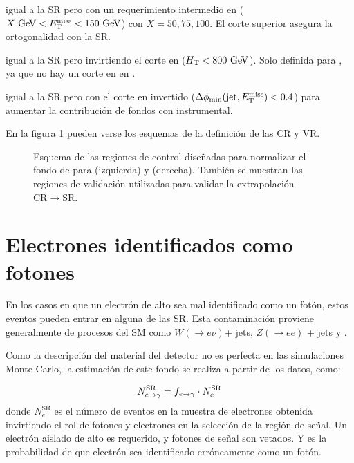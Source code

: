 \begin{description}\itemsep0.1cm
\item[{\bf VRMX}] igual a la SR pero con un requerimiento intermedio en {\met} ($X\gev < \met < 150\gev$) con $X = 50,75,100$. El corte superior asegura la ortogonalidad con la SR.
\item[{\bf VRH}]  igual a la SR pero invirtiendo el corte en  {\HT} ($\HT< 800\gev$). Solo definida para {\SRH}, ya que no hay un corte en {\HT} en {\SRL}.
\item[{\bf VRQ}]  igual a la SR pero con el corte en {\dphijm} invertido ($ \Delta \phi_{\mathrm{min}}(\mathrm{jet},E_{\mathrm{T}}^{\mathrm{miss}}) < 0.4$) para aumentar la contribución de fondos con {\met} instrumental.
\end{description}

En la figura \cref{fig:bkg_crq} pueden verse los esquemas de la definición de las CR y VR.

\begin{figure}[!htbp]
  \centering

  \resizebox{0.49\textwidth}{!}{}
  \resizebox{0.49\textwidth}{!}{}

  \caption{Esquema de las regiones de control diseñadas para normalizar el fondo
    de {\gjet} para {\SRL} (izquierda) y {\SRH} (derecha). También se muestran
    las regiones de validación utilizadas para validar la extrapolación
    $\mathrm{CR}\to\mathrm{SR}$.}
  \label{fig:bkg_crq}
\end{figure}



\section{Electrones identificados como fotones} \label{sec:efakes}

En los casos en que un electrón de alto {\pt} sea mal identificado como un
fotón, estos eventos pueden entrar en alguna de las SR. Esta contaminación
proviene generalmente de procesos del SM como $W(\to e\nu)$+ jets, $Z(\to ee)$ +
jets y {\ttbar}.

Como la descripción del material del detector no es perfecta en las simulaciones
Monte Carlo, la estimación de este fondo se realiza a partir de los datos, como:

\begin{equation}
  N_{e\rightarrow\gamma}^{\mathrm{SR}} = f_{e\rightarrow\gamma} \cdot N_e^{\mathrm{SR}}
\end{equation}
%
donde $N_e^{\mathrm{SR}}$ es el número de eventos en la muestra de electrones
obtenida invirtiendo el rol de fotones y electrones en la selección de la región
de señal. Un electrón aislado de alto {\pt} es requerido, y fotones de señal son
vetados. Y {\feg} es la probabilidad de que electrón sea identificado
erróneamente como un fotón.

